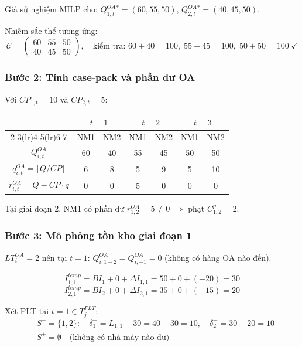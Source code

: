 \documentclass[12pt]{article}
\newcommand{\QOA}{Q^{OA}}
\newcommand{\qOA}{q^{OA}}
\newcommand{\rOA}{r^{OA}}
\begin{document}
Giả sử nghiệm MILP cho: $\QOA_{1,t}^* = (60, 55, 50)$, $\QOA_{2,t}^* = (40, 45, 50)$.

Nhiễm sắc thể tương ứng:
\[
\mathcal{C} =
\begin{pmatrix}
60 & 55 & 50 \\
40 & 45 & 50
\end{pmatrix}
, \quad
\text{kiểm tra: } 60+40=100, \; 55+45=100, \; 50+50=100 \; \checkmark
\]

\subsubsection*{Bước 2: Tính case-pack và phần dư OA}

Với $CP_{1,t}=10$ và $CP_{2,t}=5$:

\begin{center}
\begin{tabular}{ccccccc}
\toprule
& \multicolumn{2}{c}{$t=1$} & \multicolumn{2}{c}{$t=2$} & \multicolumn{2}{c}{$t=3$} \\
\cmidrule(lr){2-3}\cmidrule(lr){4-5}\cmidrule(lr){6-7}
& NM1 & NM2 & NM1 & NM2 & NM1 & NM2 \\
\midrule
$\QOA_{i,t}$ & 60 & 40 & 55 & 45 & 50 & 50 \\
$\qOA_{i,t} = \lfloor Q/CP \rfloor$ & 6 & 8 & 5 & 9 & 5 & 10 \\
$\rOA_{i,t} = Q - CP \cdot q$ & 0 & 0 & 5 & 0 & 0 & 0 \\
\bottomrule
\end{tabular}
\end{center}

Tại giai đoạn 2, NM1 có phần dư $\rOA_{1,2} = 5 \neq 0$ $\Rightarrow$ phạt $C^p_{1,2} = 2$.

\subsubsection*{Bước 3: Mô phỏng tồn kho giai đoạn 1}

$LT_i^{OA} = 2$ nên tại $t=1$: $\QOA_{i, 1-2} = \QOA_{i,-1} = 0$ (không có hàng OA nào đến).

\[
I^{temp}_{1,1} = BI_1 + 0 + \Delta I_{1,1} = 50 + 0 + (-20) = 30
\]
\[
I^{temp}_{2,1} = BI_2 + 0 + \Delta I_{2,1} = 35 + 0 + (-15) = 20
\]

Xét PLT tại $t=1 \in T_j^{PLT}$:
\begin{align*}
  &S^- = \{1, 2\}: \quad \delta_1^- = L_{1,1} - 30 = 40 - 30 = 10, \quad \delta_2^- = 30 - 20 = 10\\
  &S^+ = \emptyset \quad \text{(không có nhà máy nào dư)}
\end{align*}
\end{document}
